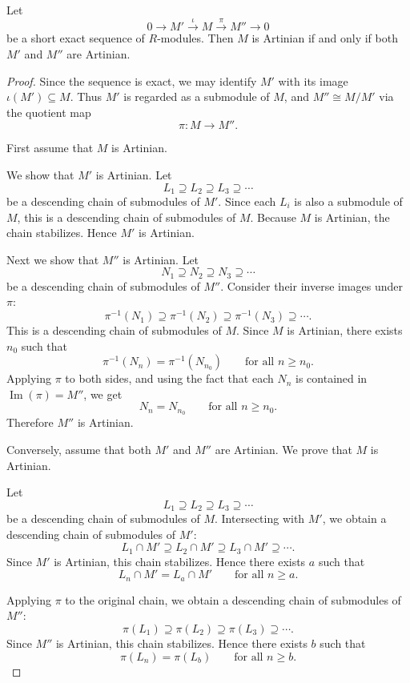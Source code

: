 \begin{proposition}
    Let
    \[
        0\longrightarrow M' \xrightarrow{\iota} M \xrightarrow{\pi} M'' \longrightarrow 0
    \]
    be a short exact sequence of $R$-modules. Then $M$ is Artinian if and only if
    both $M'$ and $M''$ are Artinian.
\end{proposition}

\begin{proof}
    Since the sequence is exact, we may identify $M'$ with its image
    $\iota(M')\subseteq M$. Thus $M'$ is regarded as a submodule of $M$, and
    $M''\cong M/M'$ via the quotient map
    \[
        \pi:M\longrightarrow M''.
    \]

    First assume that $M$ is Artinian.

    We show that $M'$ is Artinian. Let
    \[
        L_1\supseteq L_2\supseteq L_3\supseteq \cdots
    \]
    be a descending chain of submodules of $M'$. Since each $L_i$ is also a
    submodule of $M$, this is a descending chain of submodules of $M$. Because
    $M$ is Artinian, the chain stabilizes. Hence $M'$ is Artinian.

    Next we show that $M''$ is Artinian. Let
    \[
        N_1\supseteq N_2\supseteq N_3\supseteq \cdots
    \]
    be a descending chain of submodules of $M''$. Consider their inverse images
    under $\pi$:
    \[
        \pi^{-1}(N_1)\supseteq \pi^{-1}(N_2)\supseteq \pi^{-1}(N_3)\supseteq \cdots.
    \]
    This is a descending chain of submodules of $M$. Since $M$ is Artinian, there
    exists $n_0$ such that
    \[
        \pi^{-1}(N_n)=\pi^{-1}(N_{n_0})
        \qquad\text{for all } n\geq n_0.
    \]
    Applying $\pi$ to both sides, and using the fact that each $N_n$ is contained
    in $\operatorname{Im}(\pi)=M''$, we get
    \[
        N_n=N_{n_0}
        \qquad\text{for all } n\geq n_0.
    \]
    Therefore $M''$ is Artinian.

    Conversely, assume that both $M'$ and $M''$ are Artinian. We prove that $M$
    is Artinian.

    Let
    \[
        L_1\supseteq L_2\supseteq L_3\supseteq \cdots
    \]
    be a descending chain of submodules of $M$. Intersecting with $M'$, we obtain
    a descending chain of submodules of $M'$:
    \[
        L_1\cap M'\supseteq L_2\cap M'\supseteq L_3\cap M'\supseteq \cdots.
    \]
    Since $M'$ is Artinian, this chain stabilizes. Hence there exists $a$ such that
    \[
        L_n\cap M'=L_a\cap M'
        \qquad\text{for all } n\geq a.
    \]

    Applying $\pi$ to the original chain, we obtain a descending chain of
    submodules of $M''$:
    \[
        \pi(L_1)\supseteq \pi(L_2)\supseteq \pi(L_3)\supseteq \cdots.
    \]
    Since $M''$ is Artinian, this chain stabilizes. Hence there exists $b$ such that
    \[
        \pi(L_n)=\pi(L_b)
        \qquad\text{for all } n\geq b.
    \]


\end{proof}
